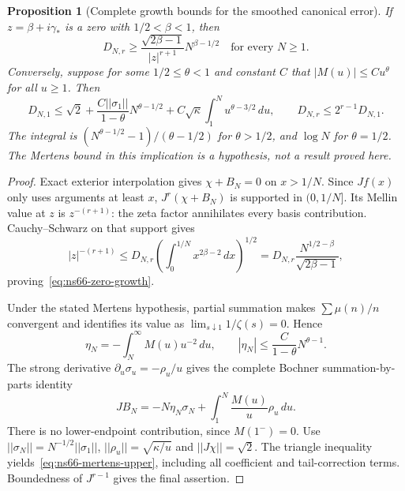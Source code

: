 \documentclass[11pt]{article}
\def\norm#1{||#1||}%
\newtheorem{proposition}[theorem]{Proposition}
\theoremstyle{remark}
\newcommand{\norm}[1]{\left\lVert #1\right\rVert}
\begin{document}
\begin{proposition}[Complete growth bounds for the smoothed canonical error]
\label{prop:ns66-growth-bounds}
If $z=\beta+i\gamma_*$ is a zero with $1/2<\beta<1$, then
\begin{equation}
 D_{N,r}\geq\frac{\sqrt{2\beta-1}}{|z|^{r+1}}N^{\beta-1/2}
 \quad\text{for every }N\geq1.
 \label{eq:ns66-zero-growth}
\end{equation}
Conversely, suppose for some $1/2\leq\theta<1$ and constant $C$
that $|M(u)|\leq Cu^\theta$ for all $u\geq1$. Then
\begin{equation}
 D_{N,1}\leq\sqrt2+
  \frac{C\norm{\sigma_1}}{1-\theta}N^{\theta-1/2}
  +C\sqrt\kappa\int_1^N u^{\theta-3/2}\,du,
 \qquad D_{N,r}\leq2^{r-1}D_{N,1}.
 \label{eq:ns66-mertens-upper}
\end{equation}
The integral is $(N^{\theta-1/2}-1)/(\theta-1/2)$ for
$\theta>1/2$, and $\log N$ for $\theta=1/2$.
The Mertens bound in this implication is a hypothesis, not a result
proved here.
\end{proposition}
\begin{proof}
Exact exterior interpolation gives $\chi+B_N=0$ on $x>1/N$.
Since $Jf(x)$ only uses arguments at least $x$, $J^r(\chi+B_N)$
is supported in $(0,1/N]$. Its Mellin value at $z$ is
$z^{-(r+1)}$: the zeta factor annihilates every basis contribution.
Cauchy--Schwarz on that support gives
\[
 |z|^{-(r+1)}\leq D_{N,r}
 \left(\int_0^{1/N}x^{2\beta-2}\,dx\right)^{1/2}
 =D_{N,r}\frac{N^{1/2-\beta}}{\sqrt{2\beta-1}},
\]
proving~\eqref{eq:ns66-zero-growth}.

Under the stated Mertens hypothesis, partial summation makes
$\sum\mu(n)/n$ convergent and identifies its value as
$\lim_{s\downarrow1}1/\zeta(s)=0$. Hence
\[
 \eta_N=-\int_N^\infty M(u)u^{-2}\,du,\qquad
 |\eta_N|\leq\frac{C}{1-\theta}N^{\theta-1}.
\]
The strong derivative $\partial_u\sigma_u=-\rho_u/u$ gives the
complete Bochner summation-by-parts identity
\begin{equation}
 JB_N=-N\eta_N\sigma_N+
           \int_1^N\frac{M(u)}u\rho_u\,du.
 \label{eq:ns66-bochner-abel}
\end{equation}
There is no lower-endpoint contribution, since $M(1^-)=0$.
Use $\norm{\sigma_N}=N^{-1/2}\norm{\sigma_1}$,
$\norm{\rho_u}=\sqrt{\kappa/u}$ and $\norm{J\chi}=\sqrt2$.
The triangle inequality yields~\eqref{eq:ns66-mertens-upper},
including all coefficient and tail-correction terms. Boundedness
of $J^{r-1}$ gives the final assertion.
\end{proof}
\end{document}
